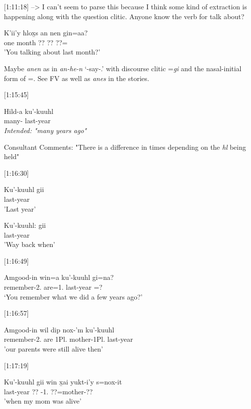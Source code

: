 [1:11:18]  --> I can't seem to parse this because I think some kind of extraction is happening along with the question clitic. Anyone know the verb for talk about?
\begin{exe}
\ex \gll K'ii'y hlox̱s an nen gin=aa?\\
one month ?? ?? ??=\Q{}\\
'You talking about last month?'
\end{exe}

Maybe \textit{anen} as in \textit{an-he-n} `\Nmlz-say-\Ssg.\Ii{}' with discourse clitic =\textit{gi} and the nasal-initial form of =\Q \Pr. See FV as well as \textit{anes} in the stories.

[1:15:45]
\begin{exe}
\ex \gll * Hild-a ku'-kuuhl\\
{} many-\Attr{} last-year\\
\textit{Intended: "many years ago"}
\end{exe}

Consultant Comments: "There is a difference in times depending on the \textit{hl} being held"

[1:16:30]
\begin{exe}
\ex \begin{xlist}
\item Ku'-kuuhl gii \\
last-year \Pst{} \\
'Last year'
\item Ku'-kuuhl: gii\\
last-year \Pst{}\\
'Way back when'
\end{xlist}
\end{exe}

[1:16:49]
\begin{exe}
\ex \gll Amg̱ood-in win=a ku'-kuuhl gi=na?\\
remember-2.\Ii{} are=1.\I{} last-year \Pst{}=\Q{}?\\
`You remember what we did a few years ago?'
\end{exe}

[1:16:57]
\begin{exe}
\ex \gll Amg̱ood-in wil dip nox-'m ku'-kuuhl\\
remember-2.\Ii{} are 1Pl.\I{} mother-1Pl.\Ii{} last-year\\
'our parents were still alive then'
\end{exe}

[1:17:19]
\begin{exe}
\ex \gll Ku'-kuuhl gii win x̱ai yukt-i'y s=nox-it\\
last-year \Pst{}  \Comp{} ?? \Prog{}-1.\Poss{} ??=mother-??\\
'when my mom was alive'
\end{exe}

